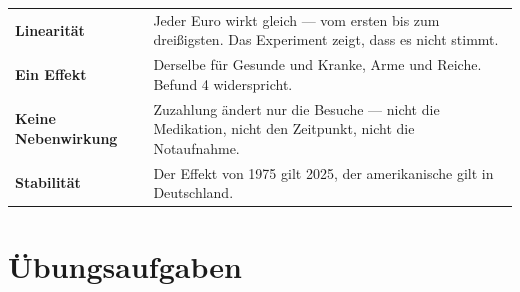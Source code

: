 \begin{warnung}
\begin{center}
{\small
\renewcommand{\arraystretch}{1.52}
\begin{tabular}{@{}P{2.8cm}P{5.8cm}@{}}
\toprule
\textbf{Linearität} & Jeder Euro wirkt gleich --- vom ersten bis zum dreißigsten. Das Experiment zeigt, dass es nicht stimmt.\\
\textbf{Ein Effekt} & Derselbe für Gesunde und Kranke, Arme und Reiche. Befund 4 widerspricht.\\
\textbf{Keine Nebenwirkung} & Zuzahlung ändert nur die Besuche --- nicht die Medikation, nicht den Zeitpunkt, nicht die Notaufnahme.\\
\textbf{Stabilität} & Der Effekt von 1975 gilt 2025, der amerikanische gilt in Deutschland.\\
\bottomrule
\end{tabular}}
\end{center}

\begin{center}
\begin{minipage}{0.88\textwidth}
\end{minipage}
\end{center}
\end{warnung}

\section{Übungsaufgaben}

